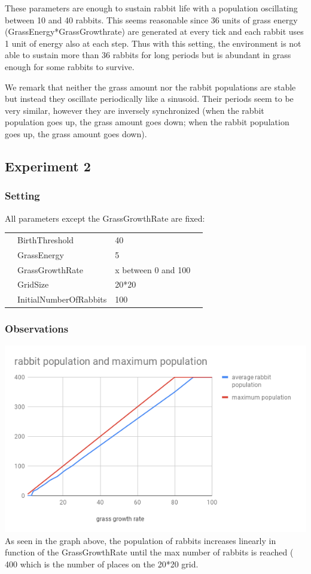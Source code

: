 \documentclass[11pt]{article}
\begin{document}
 These parameters are enough to sustain rabbit life with a population oscillating between 10 and 40 rabbits. This seems reasonable since 36 units of grass energy (GrassEnergy*GrassGrowthrate) are generated at every tick and each rabbit uses 1 unit of energy also at each step. Thus with this setting, the environment is not able to sustain more than 36 rabbits for long periods but is abundant in grass enough for some rabbits to survive.

 We remark that neither the grass amount nor the rabbit populations are stable but instead they oscillate periodically like a sinusoid. Their periods seem to be very similar, however they are inversely synchronized (when the rabbit population goes up, the grass amount goes down; when the rabbit population goes up, the grass amount goes down).


 \subsection{Experiment 2}
 \subsubsection{Setting}
 All parameters except the GrassGrowthRate are fixed:
 \begin{table}[H]
  \begin{tabular}{llll}
   &BirthThreshold  &40\\
   &GrassEnergy  &5 \\
   &GrassGrowthRate  &x between 0 and 100\\
   &GridSize  &20*20\\
   &InitialNumberOfRabbits  &100
  \end{tabular}
 \end{table}

 \subsubsection{Observations}
 
 \includegraphics[width=\textwidth]{grassgrowth.png}
 As seen in the graph above, the population of rabbits increases linearly in function of the GrassGrowthRate until the max number of rabbits is reached ( 400 which is the number of places on the 20*20 grid.
\end{document}
